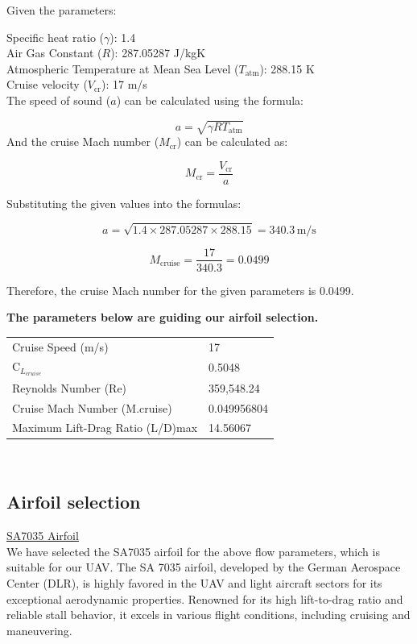 \documentclass[12 pt]{article}
\begin{document}
\begin{itemize}
Given the parameters:

 Specific heat ratio (\( \gamma \)): 1.4\\
 Air Gas Constant (\( R \)): 287.05287 J/kgK\\
 Atmospheric Temperature at Mean Sea Level (\( T_{\text{atm}} \)): 288.15 K\\
 Cruise velocity (\( V_{\text{cr}} \)): 17 m/s\\

The speed of sound (\( a \)) can be calculated using the formula:

\[
a = \sqrt{\gamma R T_{\text{atm}}} \tag{6.4}
\]
And the cruise Mach number (\( M_{\text{cr}} \)) can be calculated as:

\[
M_{\text{cr}} = \frac{V_{\text{cr}}}{a} \tag{6.5}
\]

Substituting the given values into the formulas:

\[
a = \sqrt{1.4 \times 287.05287 \times 288.15}  = 340.3 \, \text{m/s}
\]

\[
M_{\text{cruise}} = \frac{17}{340.3} = 0.0499 \tag{6.6}
\]

Therefore, the cruise Mach number for the given parameters is  0.0499.
\end{itemize}
\color{black}
\textbf{ \large The parameters below are guiding our airfoil selection.}
\begin{table}[h]
\centering
\begin{tabular}{ll}
\hline
Cruise Speed (m/s) & 17 \\
$ \text{C}_{{L}_{cruise}} $ & 0.5048 \\
Reynolds Number (Re) & 359,548.24 \\
Cruise Mach Number (M.cruise) & 0.049956804 \\
Maximum Lift-Drag Ratio (L/D)max & 14.56067 \\
\hline
\end{tabular}
\end{table}\\

\subsection{ Airfoil selection}

 \large \underline{SA7035 Airfoil}\\
\color{black}
We have selected the SA7035 airfoil for the above flow parameters, which is suitable for our UAV. The SA 7035 airfoil, developed by the German Aerospace Center (DLR), is highly favored in the UAV and light aircraft sectors for its exceptional aerodynamic properties. Renowned for its high lift-to-drag ratio and reliable stall behavior, it excels in various flight conditions, including cruising and maneuvering.
\end{document}
